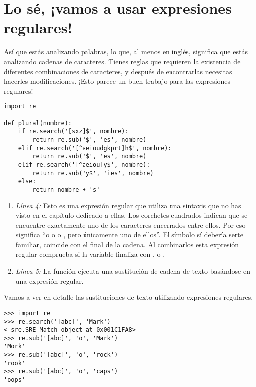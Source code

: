 \section{Lo sé, ¡vamos a usar expresiones regulares!}

Así que estás analizando palabras, lo que, al menos en inglés, significa que estás analizando cadenas de caracteres. Tienes reglas que requieren la existencia de diferentes combinaciones de caracteres, y después de encontrarlas necesitas hacerles modificaciones. ¡Esto parece un buen trabajo para las expresiones regulares!

\noindent\begin{minipage}{\textwidth}
\begin{lstlisting}[mathescape=False]
import re

def plural(nombre):          
    if re.search('[sxz]$', nombre):
        return re.sub('$', 'es', nombre)
    elif re.search('[^aeioudgkprt]h$', nombre):
        return re.sub('$', 'es', nombre)       
    elif re.search('[^aeiou]y$', nombre):      
        return re.sub('y$', 'ies', nombre)     
    else:
        return nombre + 's'
\end{lstlisting}
\end{minipage}

\begin{enumerate}

\item \emph{Línea 4:} Esto es una expresión regular que utiliza una sintaxis que no has visto en el capítulo dedicado a ellas. Los corchetes cuadrados indican que se encuentre exactamente uno de los caracteres encerrados entre ellos. Por eso \codigo{[xyz]} significa ``o  o  o , pero únicamente uno de ellos''. El símbolo \codigo{\$} sí debería serte familiar, coincide con el final de la cadena. Al combinarlos esta expresión regular comprueba si la variable  finaliza con ,  o .

\item \emph{Línea 5:} La función  ejecuta una sustitución de cadena de texto basándose en una expresión regular.

\end{enumerate}

Vamos a ver en detalle las sustituciones de texto utilizando expresiones regulares.

\noindent\begin{minipage}{\textwidth}
\begin{lstlisting}[mathescape=False]
>>> import re
>>> re.search('[abc]', 'Mark')
<_sre.SRE_Match object at 0x001C1FA8>
>>> re.sub('[abc]', 'o', 'Mark')
'Mork'
>>> re.sub('[abc]', 'o', 'rock')
'rook'
>>> re.sub('[abc]', 'o', 'caps')
'oops'
\end{lstlisting}
\end{minipage}

